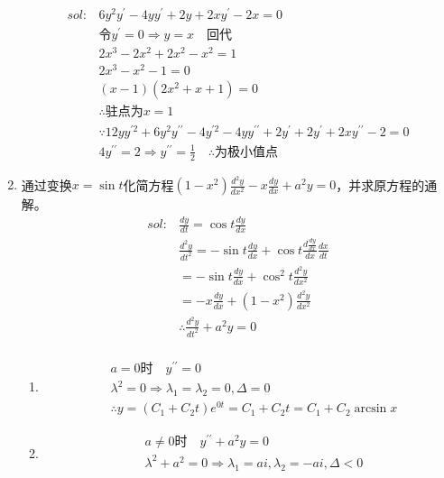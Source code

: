 \begin{enumerate}[{例}1.]
\begin{align*}
            sol:&6y^2y^{\prime}-4yy^{\prime}+2y+2xy^{\prime}-2x=0\\
                &\mbox{令}y^{\prime}=0\Rightarrow y=x\quad\mbox{回代}\\
                &2x^3-2x^2+2x^2-x^2=1\\
                &2x^3-x^2-1=0\\
                &(x-1)(2x^2+x+1)=0\\
                &\therefore\mbox{驻点为}x=1\\
                &\because 12yy^{\prime 2}+6y^2y^{\prime\prime}-4y^{\prime 2}-4yy^{\prime\prime}+2y^{\prime}+2y^{\prime}+2xy^{\prime\prime}-2=0\\
                &4y^{\prime\prime}=2\Rightarrow y^{\prime\prime}=\frac{1}{2}\quad\therefore\mbox{为极小值点}
        \end{align*}
    \item 通过变换$x=\sin t$化简方程$(1-x^2)\frac{d^2y}{dx^2}-x\frac{dy}{dx}+a^2 y=0$，并求原方程的通解。
        \begin{align*}
            sol:&\frac{dy}{dt}=\cos t \frac{dy}{dx}\\
                &\frac{d^2y}{dt^2}=-\sin t\frac{dy}{dx}+\cos t\frac{d\frac{dy}{dx}}{dx}\frac{dx}{dt}\\
                &=-\sin t\frac{dy}{dx}+\cos^2t\frac{d^2y}{dx^2}\\
                &=-x\frac{dy}{dx}+(1-x^2)\frac{d^2y}{dx^2}\\
                &\therefore \frac{d^2y}{dt^2}+a^2y=0\\
        \end{align*}
        \begin{enumerate}[(1)]
            \item
                \begin{align*}
                    &a=0\mbox{时}\quad y^{\prime\prime}=0\\
                    &\lambda^2=0\Rightarrow\lambda_1=\lambda_2=0,\Delta=0\\
                    &\therefore y=(C_1+C_2t)e^{0t}=C_1+C_2t=C_1+C_2\arcsin x
                \end{align*}
            \item
                \begin{align*}
                    &a\neq 0\mbox{时}\quad y^{\prime\prime}+a^2y=0\\
                    &\lambda^2+a^2=0\Rightarrow\lambda_1=ai,\lambda_2=-ai,\Delta<0\\

\end{align*}
\end{enumerate}
\end{enumerate}
